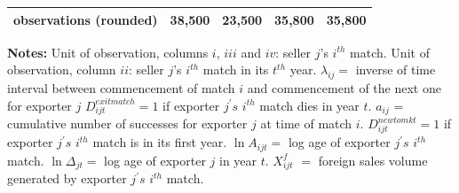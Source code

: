 \documentclass[12pt]{article}
\begin{document}
\begin{table}[tbp]
{\begin{tabular}{lllll}
observations (rounded) & 38,500 & 23,500 & 35,800 & 35,800 \\ \hline
\end{tabular}
}\endcenter
\par
\begin{tablenotes}
\item \textbf{Notes:} Unit of observation, columns $i$,  $iii$ and $iv$: seller $ j$'s $i^{th}$ match. Unit of observation, column $ii$: seller $ j$'s $i^{th}$ match in its $t^{th}$ year. $\lambda_{ij}=$ inverse of time interval between commencement of match $i$ and commencement of the next one for exporter $j$ $D_{ijt}^{exit match}=1$ if exporter $j^{\prime }s$ $i^{th}$ match dies in year $t$. $a_{ij} $ = cumulative number of successes for exporter $j$ at time of match $i$. $D_{ijt}^{new to mkt}=1$ if exporter $j^{\prime }s$ $i^{th}$ match is in its first year. $\ln A_{ijt}=$ log age of exporter $j^{\prime }s$ $i^{th}$  match. $\ln \Delta_{jt} =$ log age of exporter $j$ in year $t$. $X_{ijt}^{f}$ $=$ foreign sales volume generated by exporter $j^{\prime }s$ $i^{th}$ match.
\end{tablenotes}
\end{table}
\end{document}
